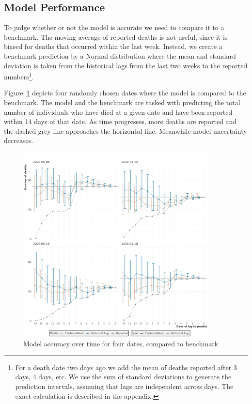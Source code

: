 \documentclass[a4paper,11pth]{article}
\begin{document}
\subsection{Model Performance}
To judge whether or not the model is accurate we need to compare it to a benchmark. The moving average of reported deaths is not useful, since it is biased for deaths that occurred within the last week. Instead, we create a benchmark prediction by a Normal distribution where the mean and standard deviation is taken from the historical lags from the last two weeks to the reported numbers\footnote{For a death date two days ago we add the mean of deaths reported after 3 days, 4 days, etc. We use the sum of standard deviations to generate the prediction intervals, assuming that lags are independent across days. The exact calculation is described in the appendix.}. 

Figure~\ref{fig:four_dates} depicts four randomly chosen dates where the model is compared to the benchmark. The model and the benchmark are tasked with predicting the total number of individuals who have died at a given date and have been reported within 14 days of that date. As time progresses, more deaths are reported and the dashed grey line approaches the horizontal line. Meanwhile model uncertainty decreases.

\begin{figure}
    \centering
    \includegraphics[width=0.9\textwidth]{plots/lag_prediction_by_date}
    \caption{Model accuracy over time for four dates, compared to benchmark}
    \label{fig:four_dates}
\end{figure}
\end{document}
